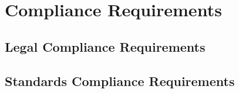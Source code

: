\chapter{Compliance Requirements}

\section{Legal Compliance Requirements}

\section{Standards Compliance Requirements}
